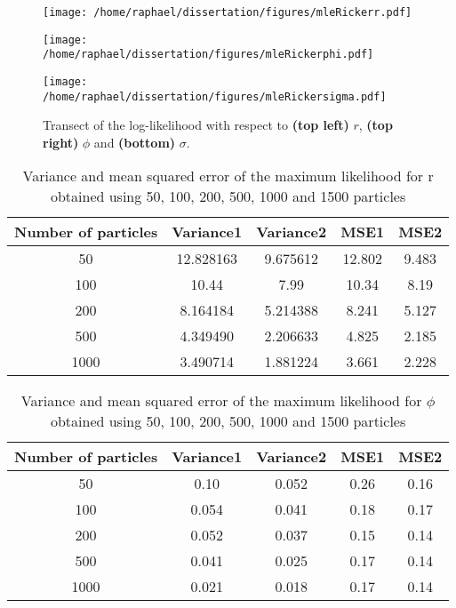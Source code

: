 \documentclass[12pt]{article}
\newcommand{\ra}[1]{\renewcommand{\arraystretch}{#1}}
\begin{document}
	\begin{figure}[htb]
		\centering
		\begin{minipage}{0.4\textwidth}
			\centering
			\texttt{[image: /home/raphael/dissertation/figures/mleRickerr.pdf]}
		\end{minipage}
		\begin{minipage}{0.4\textwidth}
			\centering
			\texttt{[image: /home/raphael/dissertation/figures/mleRickerphi.pdf]}
		\end{minipage}
		\begin{minipage}{0.4\textwidth}
			\centering
			\texttt{[image: /home/raphael/dissertation/figures/mleRickersigma.pdf]}
		\end{minipage}
		\caption{Transect of the log-likelihood with respect to \textbf{(top left)} $r$, \textbf{(top right)} $\phi$ and \textbf{(bottom)} $\sigma$.}
		\label{fig:transect}
	\end{figure}
	
	\begin{table}[htb]
		\centering
		\ra{1.3}
		\begin{tabular}{@{}ccccc@{}} \toprule
			Number of particles & Variance1 &  Variance2 & MSE1 & MSE2 \\ \midrule
			50 & 12.828163 &  9.675612 & 12.802 & 9.483\\ 
			100 & 10.44 & 7.99 & 10.34 & 8.19\\ 
			200 & 8.164184 & 5.214388 &  8.241 & 5.127\\ 
			500 & 4.349490 & 2.206633 & 4.825 & 2.185\\ 
			1000 & 3.490714 & 1.881224 & 3.661  & 2.228\\  \bottomrule
		\end{tabular}
		\caption{Variance and mean squared error of the maximum likelihood for r obtained using 50, 100, 200, 500, 1000 and 1500 particles}
		\label{table:mleR}
	\end{table}

	\begin{table}[htb]
		\centering
		\ra{1.3}
		\begin{tabular}{@{}ccccc@{}} \toprule
			Number of particles & Variance1 &  Variance2 & MSE1 & MSE2 \\ \midrule
			50 & 0.10 & 0.052 & 0.26 & 0.16\\
			100 & 0.054 & 0.041 & 0.18 & 0.17\\ 
			200 & 0.052 & 0.037 & 0.15 & 0.14\\ 
			500 & 0.041 & 0.025 & 0.17 & 0.14\\
			1000 & 0.021 & 0.018 & 0.17 & 0.14 \\ \bottomrule
		\end{tabular}
		\caption{Variance and mean squared error of the maximum likelihood for $\phi$ obtained using 50, 100, 200, 500, 1000 and 1500 particles}
		\label{table:mlePhi}
	\end{table}
\end{document}
